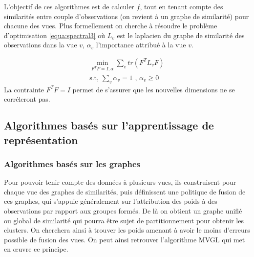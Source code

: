   		  L'objectif de ces algorithmes est de calculer $f$, tout en tenant compte des similarités entre couple d'observations (on revient à un graphe de similarité) pour chacune des vues.
  		  Plus formellement on cherche à résoudre le problème d'optimisation \ref{equa:spectral3} où $L_{v}$ est le laplacien du graphe de similarité des observations dans la vue $v$, $\alpha_{v}$ l'importance attribué à la vue $v$.
     	 
  		  \begin{equation}
  			  \begin{aligned}
      			  \min_{F^{T}F = I, \alpha} \sum_{v} tr(F^{T} L_v F) \\
      			  \text{s.t, } \sum_{v} \alpha_{v} = 1 \text{ , } \alpha_{v} \geq 0
  			  \end{aligned}
  			  \label{equa:spectral3}
  		  \end{equation}
  		  La contrainte $F^{T}F = I$ permet de s'assurer que les nouvelles dimensions ne se corréleront pas.


    \subsection{Algorithmes basés sur l'apprentissage de représentation}
 

  	  \subsubsection{Algorithmes basés sur les graphes}
		 
     	   Pour pouvoir tenir compte des données à plusieurs vues, ils construisent pour chaque vue des graphes de similarités, puis définissent une politique de fusion de ces graphes, qui s'appuie généralement sur l'attribution des poids à des observations par rapport aux groupes formés.
  		  De là on obtient un graphe unifié ou global de similarité qui pourra être sujet de partitionnement pour obtenir les clusters.
  		  On cherchera ainsi à trouver les poids amenant à avoir le moins d'erreurs possible de fusion des vues.
  		  On peut ainsi retrouver l'algorithme \acrfull{MVGL} \cite{zhan2017graph} qui met en œuvre ce principe.
    
